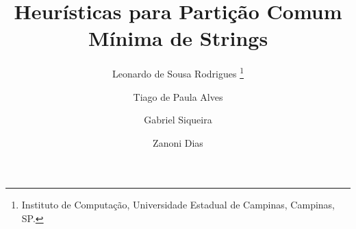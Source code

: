 \documentclass[11pt,twoside]{article}
\begin{document}




    \TRMakeCover


    \pagestyle{myheadings}

    \title{Heurísticas para Partição Comum Mínima de Strings}

    \author{
        Leonardo de Sousa Rodrigues%
            \thanks{Instituto de Computação, Universidade Estadual de Campinas, Campinas, SP.}
        \and Tiago de Paula Alves\footnotemark[1]
        \and Gabriel Siqueira\footnotemark[1]
        \and Zanoni Dias\footnotemark[1]
    }

    \date{}

    \maketitle
\end{document}

